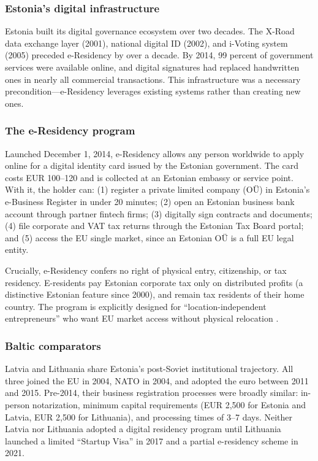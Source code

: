 \documentclass[12pt]{article}
\begin{document}
\subsubsection*{Estonia's digital infrastructure} Estonia built its digital governance ecosystem over two decades. The X-Road data exchange layer (2001), national digital ID (2002), and i-Voting system (2005) preceded e-Residency by over a decade. By 2014, 99 percent of government services were available online, and digital signatures had replaced handwritten ones in nearly all commercial transactions. This infrastructure was a necessary precondition---e-Residency leverages existing systems rather than creating new ones.

\subsubsection*{The e-Residency program} Launched December 1, 2014, e-Residency allows any person worldwide to apply online for a digital identity card issued by the Estonian government. The card costs EUR 100--120 and is collected at an Estonian embassy or service point. With it, the holder can: (1) register a private limited company (O\"{U}) in Estonia's e-Business Register in under 20 minutes; (2) open an Estonian business bank account through partner fintech firms; (3) digitally sign contracts and documents; (4) file corporate and VAT tax returns through the Estonian Tax Board portal; and (5) access the EU single market, since an Estonian O\"{U} is a full EU legal entity.

Crucially, e-Residency confers no right of physical entry, citizenship, or tax residency. E-residents pay Estonian corporate tax only on distributed profits (a distinctive Estonian feature since 2000), and remain tax residents of their home country. The program is explicitly designed for ``location-independent entrepreneurs'' who want EU market access without physical relocation \citep{sullivan2017}.

\subsubsection*{Baltic comparators} Latvia and Lithuania share Estonia's post-Soviet institutional trajectory. All three joined the EU in 2004, NATO in 2004, and adopted the euro between 2011 and 2015. Pre-2014, their business registration processes were broadly similar: in-person notarization, minimum capital requirements (EUR 2,500 for Estonia and Latvia, EUR 2,500 for Lithuania), and processing times of 3--7 days. Neither Latvia nor Lithuania adopted a digital residency program until Lithuania launched a limited ``Startup Visa'' in 2017 and a partial e-residency scheme in 2021.
\end{document}
